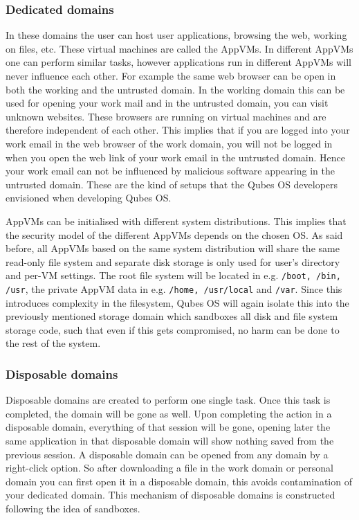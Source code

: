 \documentclass[runningheads,a4paper]{article}
\begin{document}
\subsubsection{Dedicated domains}

In these domains the user can host user applications, browsing the
web, working on files, etc. These virtual machines are called the
AppVMs. In different AppVMs one can perform similar tasks, however
applications run in different AppVMs will never influence each other. 
For example the same web browser can be
open in both the working and the untrusted domain. In the working
domain this can be used for opening your work mail and in the
untrusted domain, you can visit unknown websites. These browsers are
running on virtual machines and are therefore independent of each
other. This implies that if you are logged into your work email in
the web browser of the work domain, you will not be logged in when you
open the web link of your work email in the untrusted domain. Hence
your work email can not be influenced by malicious software appearing
in the untrusted domain. These are the kind of setups that the Qubes
OS developers envisioned when developing Qubes OS.

AppVMs can be initialised with different system
distributions. This implies that the security model of the different 
AppVMs depends on the chosen OS. As said before, all AppVMs
based on the same system distribution will share the same read-only
file system and separate disk storage is only used for user's
directory and per-VM settings. The root file system will be located in
e.g. \texttt{/boot, /bin, /usr}, the private AppVM data in
e.g. \texttt{/home, /usr/local} and \texttt{/var}. 
Since this introduces complexity in the
filesystem, Qubes OS will again isolate this into the previously
mentioned storage domain which sandboxes
all disk and file system storage code, such that even if this gets
compromised, no harm can be done to the rest of the system.

\subsubsection{Disposable domains}

Disposable domains are created to perform one single task. Once this
task is completed, the domain will be gone as well. Upon completing
the action in a disposable domain, everything of that session will be
gone, opening later the same application in that disposable domain
will show nothing saved from the previous session. A disposable domain
can be opened from any domain by a right-click option. So after
downloading a file in the work domain or personal domain you can first
open it in a disposable domain, this avoids contamination of your
dedicated domain. This mechanism of disposable domains is constructed
following the idea of sandboxes.
\end{document}
